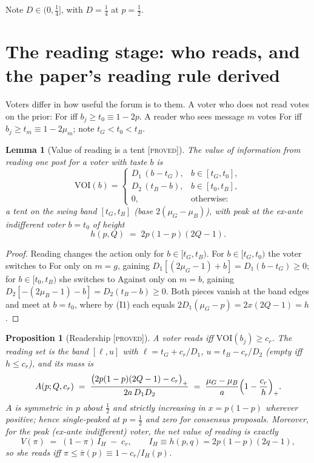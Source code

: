 \documentclass[11pt]{article}
\newtheorem{lemma}{Lemma}
\newtheorem{proposition}{Proposition}
\theoremstyle{remark}
\newcommand{\statusP}{\textsc{[proved]}}
\begin{document}
Note $D\in(0,\tfrac14]$, with $D=\tfrac14$ at $p=\tfrac12$.

\section{The reading stage: who reads, and the paper's reading rule derived}
\label{sec:read}

Voters differ in how useful the forum is to them. A voter who does not read
votes on the prior: For iff $b_j\ge t_0\equiv 1-2p$. A reader who sees message
$m$ votes For iff $b_j\ge t_m\equiv 1-2\mu_m$; note $t_G<t_0<t_B$.

\begin{lemma}[Value of reading is a tent \statusP]\label{lem:tent}
The value of information from reading one post for a voter with taste $b$ is
\[
\mathrm{VOI}(b)=
\begin{cases}
D_1\,(b-t_G), & b\in[t_G,t_0],\\[2pt]
D_2\,(t_B-b), & b\in[t_0,t_B],\\[2pt]
0,& \text{otherwise:}
\end{cases}
\]
a tent on the swing band $[t_G,t_B]$ (base $2(\mu_G-\mu_B)$), with peak at the
ex-ante indifferent voter $b=t_0$ of height
\begin{equation}\label{eq:peak}
h(p,Q)\;=\;2p(1-p)(2Q-1).
\end{equation}
\end{lemma}

\begin{proof}
Reading changes the action only for $b\in[t_G,t_B)$. For $b\in[t_G,t_0)$ the
voter switches to For only on $m=g$, gaining $D_1[(2\mu_G-1)+b]=D_1(b-t_G)\ge0$;
for $b\in[t_0,t_B)$ she switches to Against only on $m=b$, gaining
$D_2[-(2\mu_B-1)-b]=D_2(t_B-b)\ge0$. Both pieces vanish at the band edges and
meet at $b=t_0$, where by (I1) each equals $2D_1(\mu_G-p)=2x(2Q-1)=h$.
\end{proof}

\begin{proposition}[Readership \statusP]\label{prop:readership}
A voter reads iff $\mathrm{VOI}(b_j)\ge c_r$. The reading set is the band
$[\ell,u]$ with $\ell=t_G+c_r/D_1$, $u=t_B-c_r/D_2$ (empty iff $h\le c_r$), and
its mass is
\begin{equation}\label{eq:A}
A(p;Q,c_r)\;=\;\frac{\bigl(2p(1-p)(2Q-1)-c_r\bigr)_+}{2a\,D_1D_2}
\;=\;\frac{\mu_G-\mu_B}{a}\Bigl(1-\frac{c_r}{h}\Bigr)_+ .
\end{equation}
$A$ is symmetric in $p$ about $\tfrac12$ and strictly increasing in $x=p(1-p)$
wherever positive; hence single-peaked at $p=\tfrac12$ and zero for consensus
proposals. Moreover, for the peak (ex-ante indifferent) voter, the net value of
reading is \emph{exactly}
\begin{equation}\label{eq:readrule}
V(\pi)\;=\;(1-\pi)\,I_H\;-\;c_r,\qquad I_H\equiv h(p,q)=2p(1-p)(2q-1),
\end{equation}
so she reads iff $\pi\le \bar\pi(p)\equiv 1-c_r/I_H(p)$.
\end{proposition}
\end{document}
